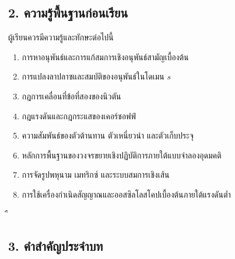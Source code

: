 
\subsection{2. ความรู้พื้นฐานก่อนเรียน}

ผู้เรียนควรมีความรู้และทักษะต่อไปนี้

\begin{enumerate}
    \item การหาอนุพันธ์และการแก้สมการเชิงอนุพันธ์สามัญเบื้องต้น
    \item การแปลงลาปลาซและสมบัติของอนุพันธ์ในโดเมน $s$
    \item กฎการเคลื่อนที่ข้อที่สองของนิวตัน
    \item กฎแรงดันและกฎกระแสของเคอร์ชอฟฟ์
    \item ความสัมพันธ์ของตัวต้านทาน ตัวเหนี่ยวนำ และตัวเก็บประจุ
    \item หลักการพื้นฐานของวงจรขยายเชิงปฏิบัติการภายใต้แบบจำลองอุดมคติ
    \item การจัดรูปพหุนาม เมทริกซ์ และระบบสมการเชิงเส้น
    \item การใช้เครื่องกำเนิดสัญญาณและออสซิลโลสโคปเบื้องต้นภายใต้แรงดันต่ำ
\end{enumerate}


ื\newpage

\subsection{3. คำสำคัญประจำบท}

